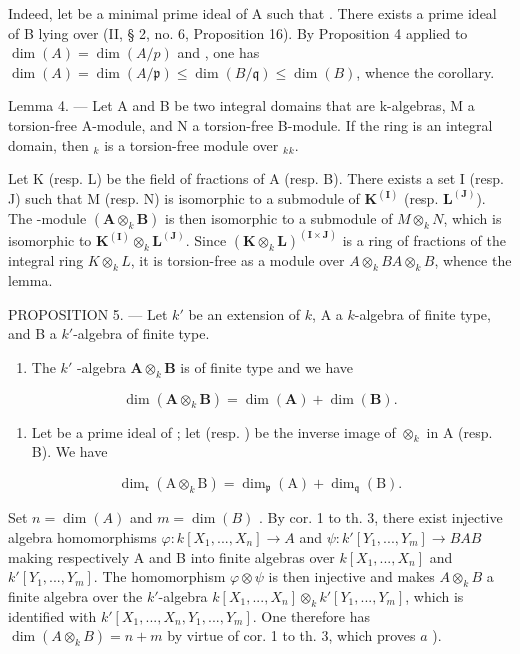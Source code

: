 Indeed, let  be a minimal prime ideal of A such that . There exists a prime ideal  of B lying over  (II, § 2, no. 6, Proposition 16). By Proposition 4 applied to \(\dim(A) = \dim(A/p)\) and , one has \(\dim(A) = \dim(A/\mathfrak{p}) \leqslant \dim(B/\mathfrak{q}) \leqslant \dim(B)\), whence the corollary.

Lemma 4. --- Let A and B be two integral domains that are k-algebras, M a torsion-free A-module, and N a torsion-free B-module. If the ring  is an integral domain, then \(_{k}\) is a torsion-free module over \(_{k}\)\(_{k}\).

Let K (resp. L) be the field of fractions of A (resp. B). There exists a set I (resp. J) such that M (resp. N) is isomorphic to a submodule of \(\mathbf{K}^{(\mathbf{I})}\) (resp. \(\mathbf{L}^{(\mathbf{J})}\)). The -module \((\mathbf{A} \otimes_k \mathbf{B})\) is then isomorphic to a submodule of \(M \otimes_k N\), which is isomorphic to \(\mathbf{K}^{(\mathbf{I})} \otimes_k \mathbf{L}^{(\mathbf{J})}\). Since \((\mathbf{K} \otimes_k \mathbf{L})^{(\mathbf{I} \times \mathbf{J})}\) is a ring of fractions of the integral ring \(K \otimes_k L\), it is torsion-free as a module over \(A \otimes_k B\)\(A \otimes_k B\), whence the lemma.

PROPOSITION 5. --- Let \(k'\) be an extension of \(k\), A a \(k\)-algebra of finite type, and B a \(k'\)-algebra of finite type.

\begin{enumerate}
\def\labelenumi{\alph{enumi})}
\tightlist
\item
  The \(k'\) -algebra \(\mathbf{A} \otimes_k \mathbf{B}\) is of finite type and we have
\end{enumerate}

\[
\dim (\mathbf {A} \otimes_ {k} \mathbf {B}) = \dim (\mathbf {A}) + \dim (\mathbf {B}).
\]

\begin{enumerate}
\def\labelenumi{\alph{enumi})}
\setcounter{enumi}{1}
\tightlist
\item
  Let  be a prime ideal of ; let  (resp. ) be the inverse image of \(\otimes_{k}\) in A (resp. B). We have
\end{enumerate}

\[
\dim_ {\mathfrak {r}} (\mathrm{A} \otimes_ {k} \mathrm{B}) = \dim_ {\mathfrak {p}} (\mathrm{A}) + \dim_ {\mathfrak {q}} (\mathrm{B}).
\]

Set \(n = \dim(A)\) and \(m = \dim(B)\) . By cor. 1 to th. 3, there exist injective algebra homomorphisms \(\varphi: k[X_1, ..., X_n] \to A\) and \(\psi: k'[Y_1, ..., Y_m] \to B\)\(A\)\(B\) making respectively A and B into finite algebras over \(k[X_1, ..., X_n]\) and \(k'[Y_1, ..., Y_m]\). The homomorphism \(\varphi \otimes \psi\) is then injective and makes \(A \otimes_k B\) a finite algebra over the \(k'\)-algebra \(k[X_1, ..., X_n] \otimes_k k'[Y_1, ..., Y_m]\), which is identified with \(k'[X_1, ..., X_n, Y_1, ..., Y_m]\). One therefore has \(\dim(A \otimes_k B) = n + m\) by virtue of cor. 1 to th. 3, which proves \(a\) ).

